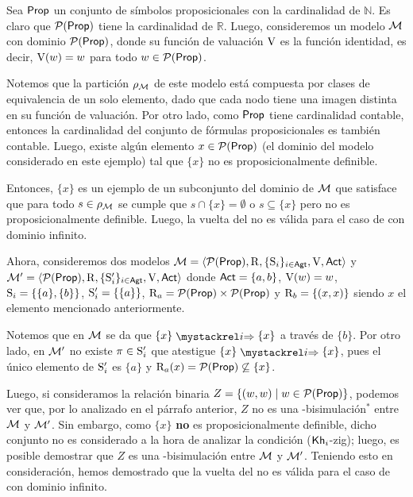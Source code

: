 \begin{ejemplo}
    Sea $\PROP$ un conjunto de símbolos proposicionales con la cardinalidad de $\mathbb{N}$. Es claro que $\mathcal{P}(\PROP)$ tiene 
    la cardinalidad de $\mathbb{R}$. Luego, consideremos un modelo $\model$ con dominio $\mathcal{P}(\PROP)$, donde su función de valuación 
    $\V$ es la función identidad, es decir, $\V(w) = w$ para todo $w \in \mathcal{P}(\PROP)$.
    
    Notemos que la partición $\rho_\modults$ de este modelo está compuesta por clases de equivalencia de un solo elemento, 
    dado que cada nodo tiene una imagen distinta en su función de valuación. Por otro lado, como $\PROP$ tiene cardinalidad contable, entonces la 
    cardinalidad del conjunto de fórmulas proposicionales es también contable. Luego, existe algún elemento $x \in \mathcal{P}(\PROP)$ 
    (el dominio del modelo considerado en este ejemplo) tal que $\{x\}$ no es proposicionalmente definible.
    
    Entonces, $\{x\}$ es un ejemplo de un subconjunto del dominio de $\model$ que satisface que para todo $s \in \rho_\modults$ se cumple que 
    $s \cap \{x\} = \emptyset$ o $s \subseteq \{x\}$ pero no es proposicionalmente definible. Luego, la vuelta del 
    no es válida para el caso de \ultss con dominio infinito.

    Ahora, consideremos dos modelos $\model = \tup{\mathcal{P}(\PROP),\R,\cset{\S_i}_{i \in \AGT},\V,\ACT}$ y 
    $\model'=\tup{\mathcal{P}(\PROP),\R,\cset{\S'_i}_{i \in \AGT},\V,\ACT}$ donde $\ACT = \{a,b\}$, $\V(w) = w$, 
    $\S_i = \{\{a\}, \{b\}\}$, $\S'_i = \{\{a\}\}$, $\R_a = \mathcal{P}(\PROP) \times \mathcal{P}(\PROP)$ y $\R_b = \{(x,x)\}$ 
    siendo $x$ el elemento mencionado anteriormente. 
    
    Notemos que en $\model$ se da que $\{x\} \ultsExecAgi \{x\}$ a través de $\{b\}$. Por otro lado, en $\model'$ no existe $\pi \in \S'_i$ que 
    atestigue $\{x\} \ultsExecAgi \{x\}$, pues el único elemento de $\S'_i$ es $\{a\}$ y $\R_a(x) = \mathcal{P}(\PROP) \not\subseteq \{x\}$.

    Luego, si consideramos la relación binaria $Z = \{(w,w) \mid w\in\mathcal{P}(\PROP)\}$, podemos ver que, por lo analizado en el
    párrafo anterior, $Z$ no es una \KHilogic-bisimulación$^*$ entre $\model$ y $\model'$. Sin embargo, como $\{x\}$ \textbf{no} 
    es proposicionalmente definible, dicho conjunto no es considerado a la hora de analizar la condición ($\khi$-zig); luego, es posible 
    demostrar que $Z$ es una \KHilogic-bisimulación entre $\model$ y $\model'$. Teniendo esto en consideración, hemos demostrado que la vuelta 
    del  no es válida para el caso de \ultss con dominio infinito.
\end{ejemplo}


